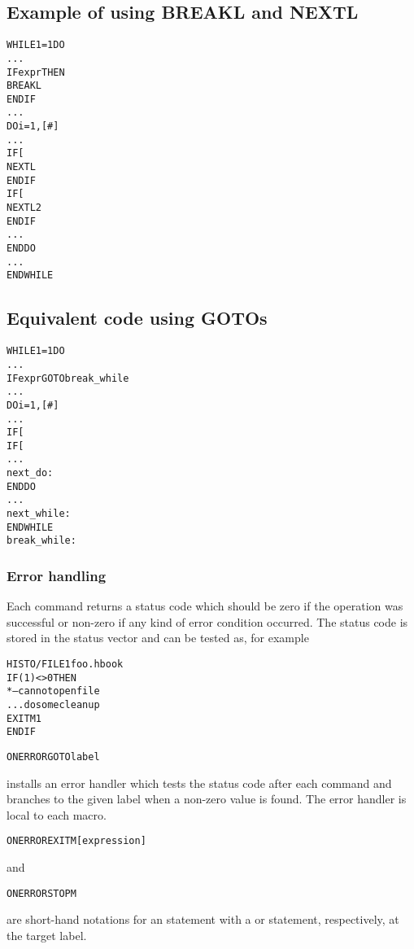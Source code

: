 \subsection*{Example of using BREAKL and NEXTL}
\begin{alltt}
WHILE 1=1 DO
   ...
   IF expr THEN
      BREAKL
   ENDIF
   ...
   DO i=1,[#]
      ...
      IF [%i]='-' THEN
         NEXTL
      ENDIF
      IF [%i]='--' THEN
         NEXTL 2
      ENDIF
      ...
   ENDDO
   ...
ENDWHILE
\end{alltt}
\subsection*{Equivalent code using GOTOs}
\begin{alltt}
WHILE 1=1 DO
   ...
   IF expr GOTO break_while
   ...
   DO i=1,[#]
      ...
      IF [%i]='-' GOTO next_do
      IF [%i]='--' GOTO next_while
     ...
   next_do:
   ENDDO
   ...
next_while:
ENDWHILE
break_while:
\end{alltt}

\subsubsection{Error handling}

Each command returns a status code which should be zero if the
operation was successful or non-zero if any kind of error condition
occurred. 
The status code is stored in the  status vector and can be
tested as, for example
\begin{alltt}
HISTO/FILE 1 foo.hbook
IF (1)<>0 THEN
*-- cannot open file
   ... do some cleanup
   EXITM 1
ENDIF
\end{alltt}

\begin{alltt}
ON ERROR GOTO label
\end{alltt}
installs an error handler which tests the status code after each
command and branches to the given label when a non-zero value is
found.
The error handler is local to each macro.

\begin{alltt}
ON ERROR EXITM  [ expression ]
\end{alltt}
and
\begin{alltt}
ON ERROR STOPM
\end{alltt}
are short-hand notations for an  statement with a
 or  statement, respectively, at the target
label.

